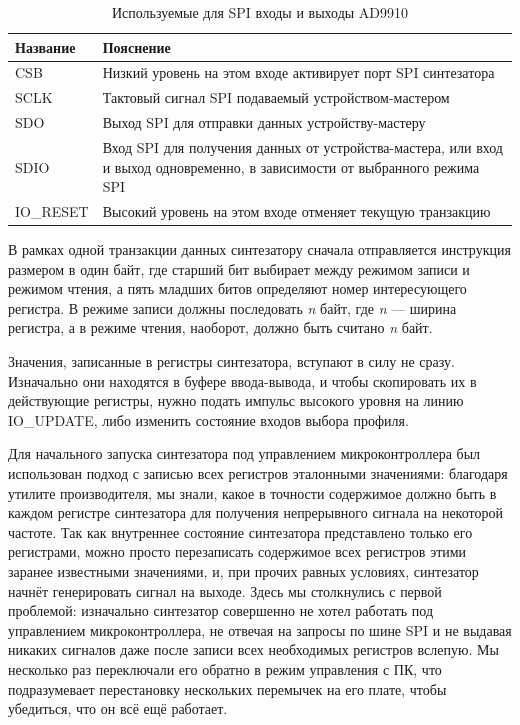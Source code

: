 \documentclass[rusmathsym, eqnumwithinsec, amspack, hyperref]{bomgost}
\begin{document}
\begin{table}[H]
\centering
\caption{Используемые для SPI входы и выходы AD9910}
\label{tab:spi_pins}
\begin{tabular}{|p{4cm}|p{8cm}|}
\hline 
\textbf{Название} & \textbf{Пояснение} \\ 
\hline 
CSB & Низкий уровень на этом входе активирует порт SPI синтезатора \\ 
\hline
SCLK & Тактовый сигнал SPI подаваемый устройством-мастером \\
\hline
SDO & Выход SPI для отправки данных устройству-мастеру \\
\hline
SDIO & Вход SPI для получения данных от устройства-мастера, или вход и выход одновременно, в зависимости от выбранного режима SPI \\
\hline 
IO\_RESET & Высокий уровень на этом входе отменяет текущую транзакцию \\
\hline
\end{tabular} 
\end{table}

В рамках одной транзакции данных синтезатору сначала отправляется инструкция размером в один байт, где старший бит выбирает между режимом записи и режимом чтения, а пять младших битов определяют номер интересующего регистра. В режиме записи должны последовать {\em n} байт, где {\em n} — ширина регистра, а в режиме чтения, наоборот, должно быть считано {\em n} байт.

Значения, записанные в регистры синтезатора, вступают в силу не сразу. Изначально они находятся в буфере ввода-вывода, и чтобы скопировать их в действующие регистры, нужно подать импульс высокого уровня на линию IO\_UPDATE, либо изменить состояние входов выбора профиля.

Для начального запуска синтезатора под управлением микроконтроллера был использован подход с записью всех регистров эталонными значениями: благодаря утилите производителя, мы знали, какое в точности содержимое должно быть в каждом регистре синтезатора для получения непрерывного сигнала на некоторой частоте. Так как внутреннее состояние синтезатора представлено только его регистрами, можно просто перезаписать содержимое всех регистров этими заранее известными значениями, и, при прочих равных условиях, синтезатор начнёт генерировать сигнал на выходе. Здесь мы столкнулись с первой проблемой: изначально синтезатор совершенно не хотел работать под управлением микроконтроллера, не отвечая на запросы по шине SPI и не выдавая никаких сигналов даже после записи всех необходимых регистров вслепую. Мы несколько раз переключали его обратно в режим управления с ПК, что подразумевает перестановку нескольких перемычек на его плате, чтобы убедиться, что он всё ещё работает.
\end{document}
